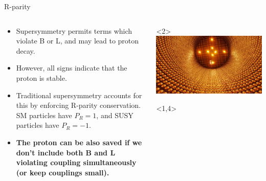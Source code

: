 \documentclass[]{beamer}
\begin{document}
\begin{frame}{R-parity}
  \begin{columns}
    \begin{column}{0.6\textwidth}
      \begin{itemize}[<+->]
      \item<1-> Supersymmetry permits terms which violate B or L, and may lead to proton decay.
      \item<2-> However, all signs indicate that the proton is stable. 
      \item<3-> Traditional supersymmetry accounts for this by enforcing R-parity conservation. SM particles have $P_{R}=1$, and SUSY particles have $P_R=-1$.
      \item<4-> \textbf{The proton can be also saved if we don't include both B and L violating coupling simultaneously (or keep couplings small).}
      \end{itemize}
    \end{column}
    \begin{column}{0.4\textwidth}
      \begin{onlyenv}<2>
        \href{https://www-sk.icrr.u-tokyo.ac.jp/en/sk/}{\includegraphics[width=\textwidth]{figures/kamiokande.png}}
      \vspace{1cm}

      \scalebox{0.7}{\begin{tikzpicture} \protondecay \end{tikzpicture}}
    \end{onlyenv}
    \begin{onlyenv}<1,4>
      \begin{center}
        \scalebox{0.7}{\begin{tikzpicture} \protondecay \end{tikzpicture}}
      \end{center}


\end{onlyenv}
\end{column}
\end{columns}
\end{frame}
\end{document}
